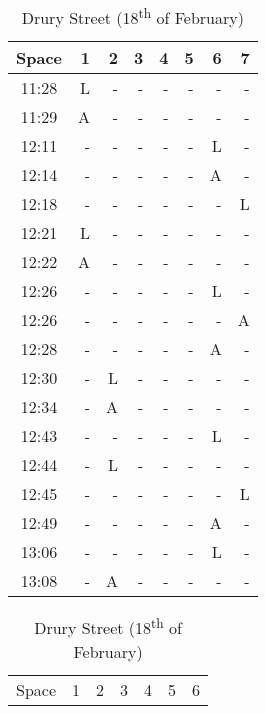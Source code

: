 \begin{table}[H]
    \centering
    \setlength\tabcolsep{4pt}
    \begin{minipage}{0.48\textwidth}
        \centering
        \begin{tabular}{|c|r|r|r|r|r|r|r|}
            \hline
            Space & 1 & 2 & 3 & 4 & 5 & 6 & 7 \\
            \hline\hline
            11:28 & L & - & - & - & - & - & - \\ \hline
            11:29 & A & - & - & - & - & - & - \\ \hline
            12:11 & - & - & - & - & - & L & - \\ \hline
            12:14 & - & - & - & - & - & A & - \\ \hline
            12:18 & - & - & - & - & - & - & L \\ \hline
            12:21 & L & - & - & - & - & - & - \\ \hline
            12:22 & A & - & - & - & - & - & - \\ \hline
            12:26 & - & - & - & - & - & L & - \\ \hline
            12:26 & - & - & - & - & - & - & A \\ \hline
            12:28 & - & - & - & - & - & A & - \\ \hline
            12:30 & - & L & - & - & - & - & - \\ \hline
            12:34 & - & A & - & - & - & - & - \\ \hline
            12:43 & - & - & - & - & - & L & - \\ \hline
            12:44 & - & L & - & - & - & - & - \\ \hline
            12:45 & - & - & - & - & - & - & L \\ \hline
            12:49 & - & - & - & - & - & A & - \\ \hline
            13:06 & - & - & - & - & - & L & - \\ \hline
            13:08 & - & A & - & - & - & - & - \\
            \hline
        \end{tabular}
        \caption{Drury Street (18\textsuperscript{th} of February)}
        \label{table:druryStreet} 
        \end{minipage}%
        \hfill
        \begin{minipage}{0.48\textwidth}
        \centering
        \begin{tabular}{|c|r|r|r|r|r|r|}
            \hline
            Space & 1 & 2 & 3 & 4 & 5 & 6 \\

\end{tabular}
\end{minipage}
\end{table}
